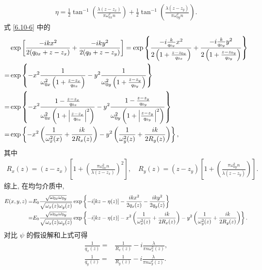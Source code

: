 \documentclass{note}
\begin{document}
\begin{pf}
\begin{gather}
        \eta=\frac{1}{2}\tan^{-1}\left(\frac{\lambda(z-z_x)}{\pi\omega_{0x}^2n}\right)+\frac{1}{2}\tan^{-1}\left(\frac{\lambda(z-z_y)}{\pi\omega_{0y}^2n}\right).
    \end{gather}
    式 \eqref{6.10-6} 中的
    \begin{align}
        \notag&\exp\left[\frac{-ikx^2}{2(q_{0x}+z-z_x)}+\frac{-iky^2}{2(q_0+z-z_y)}\right]=\exp\left\{\frac{-i\frac{k}{q_{0x}}x^2}{2\left(1+\frac{z-z_{0x}}{q_{0x}}\right)}+\frac{-i\frac{k}{q_{0y}}y^2}{2\left(1+\frac{z-z_{0y}}{q_{0y}}\right)}\right\}\\
        \notag=&\exp\left\{-x^2\frac{1}{\omega_{0x}^2\left(1+\frac{z-z_x}{q_{0x}}\right)}-y^2\frac{1}{\omega_{0y}^2\left(1+\frac{z-z_y}{q_{0y}}\right)}\right\}\\
        \notag=&\exp\left\{-x^2\frac{1-\frac{z-z_x}{q_{0x}}}{\omega_{0x}^2\left(1+\left\lvert\frac{z-z_x}{q_{0x}}\right\rvert^2\right)}-y^2\frac{1-\frac{z-z_y}{q_{0y}}}{\omega_{0y}^2\left(1+\left\lvert\frac{z-z_y}{q_{0y}}\right\rvert^2\right)}\right\}\\
        =&\exp\left\{-x^2\left(\frac{1}{\omega_x^2(x)}+\frac{ik}{2R_x(z)}\right)-y^2\left(\frac{1}{\omega_y^2(z)}+\frac{ik}{2R_y(z)}\right)\right\},
    \end{align}
    其中
    \begin{align}
        R_x(z)=(z-z_x)\left[1+\left(\frac{\pi\omega_{0x}^2n}{\lambda(z-z_x)}\right)^2\right],\quad R_y(z)=(z-z_y)\left[1+\left(\frac{\pi\omega_{0y}^2n}{\lambda(z-z_y)}\right)\right].
    \end{align}
    综上, 在均匀介质中,
    \begin{align}
        \notag E(x,y,z)=&E_0\frac{\sqrt{\omega_{0x}\omega_{0y}}}{\sqrt{\omega_x(z)\omega_y(z)}}\exp\left\{-i[kz-\eta(z)]-\frac{ikx^2}{2q_x(z)}-\frac{iky^2}{2q_y(z)}\right\}\\
        =&E_0\frac{\sqrt{\omega_{0x}\omega_{0y}}}{\sqrt{\omega_x(z)\omega_y(z)}}\exp\left\{-i[kz-\eta(z)]-x^2\left(\frac{1}{\omega_x^2(z)}+\frac{ik}{2R_x(z)}\right)-y^2\left(\frac{1}{\omega_y^2(z)}+\frac{ik}{2R_y(z)}\right)\right\}.
    \end{align}
    对比 $\psi$ 的假设解和上式可得
    \begin{align}
        \frac{1}{q_x(z)}=&\frac{1}{R_x(z)}-i\frac{\lambda}{\pi n\omega_x^2(z)},\\
        \frac{1}{q_y(z)}=&\frac{1}{R_y(z)}-i\frac{\lambda}{\pi n\omega_y^2(z)}.
    \end{align}


\end{pf}
\end{document}
